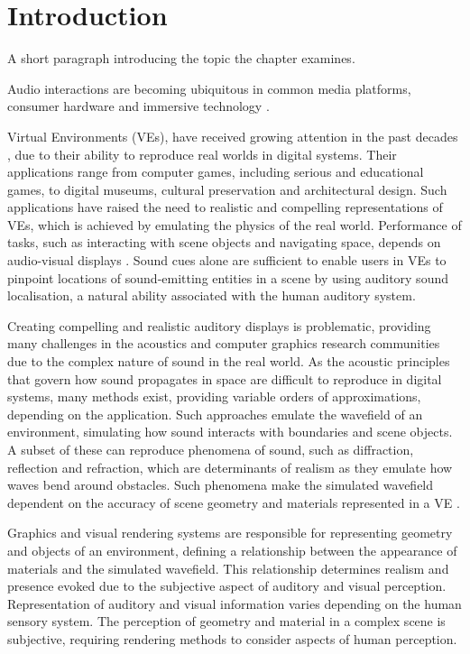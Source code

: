\chapter{Introduction}
\label{ch:introduction}
\setcounter{page}{1}

A short paragraph introducing the topic the chapter examines.

Audio interactions are becoming ubiquitous in common media platforms, consumer hardware and immersive technology \cite{yang2019audio}.

Virtual Environments (VEs), have received growing attention in the past decades \citep{rubio2017immersive}, due to their ability to reproduce real worlds in digital systems. Their applications range from computer games, including serious and educational games, to digital museums, cultural preservation and architectural design. Such applications have raised the need to realistic and compelling representations of VEs, which is achieved by emulating the physics of the real world. Performance of tasks, such as interacting with scene objects and navigating space, depends on audio-visual displays \citep{zimmons2003influence, lokki2005navigation}. Sound cues alone are sufficient to enable users in VEs to pinpoint locations of sound-emitting entities in a scene by using auditory sound localisation, a natural ability associated with the human auditory system. \par
Creating compelling and realistic auditory displays is problematic, providing many challenges in the acoustics and computer graphics research communities due to the complex nature of sound in the real world. As the acoustic principles that govern how sound propagates in space are difficult to reproduce in digital systems, many methods exist, providing variable orders of approximations, depending on the application. Such approaches emulate the wavefield of an environment, simulating how sound interacts with boundaries and scene objects. A subset of these can reproduce phenomena of sound, such as diffraction, reflection and refraction, which are determinants of realism as they emulate how waves bend around obstacles. Such phenomena make the simulated wavefield dependent on the accuracy of scene geometry and materials represented in a VE \citep{kuttruff2016room}. \par
Graphics and visual rendering systems are responsible for representing geometry and objects of an environment, defining a relationship between the appearance of materials and the simulated wavefield. This relationship determines realism and presence evoked due to the subjective aspect of auditory and visual perception.
Representation of auditory and visual information varies depending on the human sensory system. The perception of geometry and material in a complex scene is subjective, requiring rendering methods to consider aspects of human perception. 

